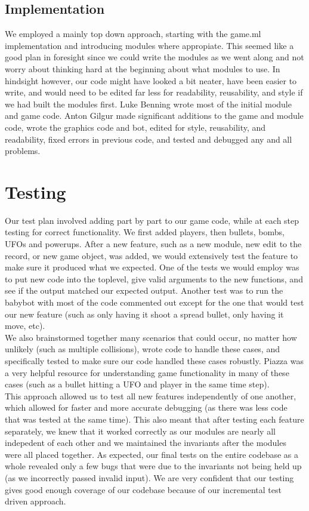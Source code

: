 \documentclass{article}
\begin{document}
\subsection{Implementation}
We employed a mainly top down approach, starting with the game.ml implementation and introducing modules where appropiate. This seemed like a good plan in foresight since we could write the modules as we went along and not worry about thinking hard at the beginning about what modules to use. In hindsight however, our code might have looked a bit neater, have been easier to write, and would need to be edited far less for readability, reusability, and style if we had built the modules first. Luke Benning wrote most of the initial module and game code. Anton Gilgur made significant additions to the game and module code, wrote the graphics code and bot, edited for style, reusability, and readability, fixed errors in previous code, and tested and debugged any and all problems.

\section{Testing}
Our test plan involved adding part by part to our game code, while at each step testing for correct functionality. We first added players, then bullets, bombs, UFOs and powerups. After a new feature, such as a new module, new edit to the record, or new game object, was added, we would extensively test the feature to make sure it produced what we expected. One of the tests we would employ was to put new code into the toplevel, give valid arguments to the new functions, and see if the output matched our expected output. Another test was to run the babybot with most of the code commented out except for the one that would test our new feature (such as only having it shoot a spread bullet, only having it move, etc). \\

We also brainstormed together many scenarios that could occur, no matter how unlikely (such as multiple collisions), wrote code to handle these cases, and specifically tested to make sure our code handled these cases robustly. Piazza was a very helpful resource for understanding game functionality in many of these cases (such as a bullet hitting a UFO and player in the same time step). \\

This approach allowed us to test all new features independently of one another, which allowed for faster and more accurate debugging (as there was less code that was tested at the same time). This also meant that after testing each feature separately, we knew that it worked correctly as our modules are nearly all indepedent of each other and we maintained the invariants after the modules were all placed together. As expected, our final tests on the entire codebase as a whole revealed only a few bugs that were due to the invariants not being held up (as we incorrectly passed invalid input). 
We are very confident that our testing gives good enough coverage of our codebase because of our incremental test driven approach.
\end{document}
